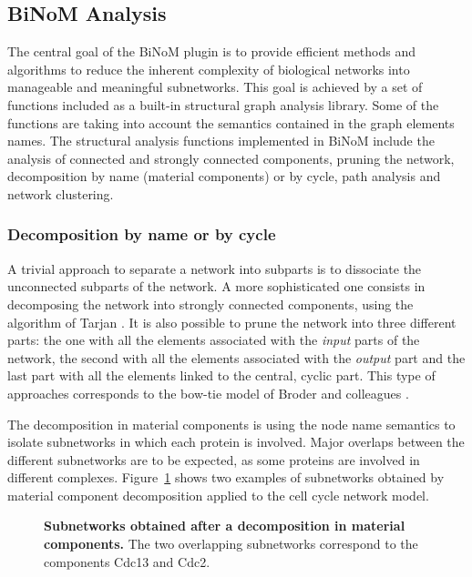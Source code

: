 \documentclass[10pt]{bmc_article}
\newenvironment{bmcformat}{\baselineskip20pt\sloppy\setboolean{publ}{false}}{\baselineskip20pt\sloppy}
\begin{document}
\begin{bmcformat}
\subsection*{BiNoM Analysis}
The central goal of the BiNoM plugin is to provide efficient methods
and algorithms to reduce the inherent complexity of biological networks into
manageable and meaningful subnetworks. This goal is achieved by a set of
functions included as a built-in structural graph analysis library. Some of the functions are taking into
account the semantics contained in the graph elements names. 
The structural analysis functions implemented in BiNoM include the analysis of
connected and strongly connected components, pruning the network, decomposition
by name (material components) or by cycle, path analysis and network clustering.


\subsubsection*{Decomposition by name or by cycle}
A trivial approach to separate a network into subparts is to dissociate the unconnected subparts
of the network. A more sophisticated one consists in decomposing the network into
strongly connected components, using the algorithm of Tarjan
\cite{tarjan1972depth}. It is also possible to prune the network into three different parts:
the one with all the elements associated with the \emph{input} parts of the network, the
second with all the elements associated with the \emph{output} part and the last
part with all the elements linked to the central, cyclic part. This type of approaches
corresponds to the bow-tie model of Broder and colleagues \cite{broder2000graph}.

The decomposition in material components is using the node name semantics to
isolate subnetworks in which each protein is involved. Major overlaps between
the different subnetworks are to be expected, as some proteins are involved in
different complexes. Figure~\ref{matcdc2cdc13} shows two examples of subnetworks
obtained by material component decomposition applied to the cell cycle network
model.

\begin{figure}[h]
 \caption{\label{matcdc2cdc13}  \textbf{Subnetworks obtained after a decomposition in
material components.} The two overlapping subnetworks correspond to the components Cdc13 and
Cdc2.}
\end{figure}



\end{bmcformat}
\end{document}

